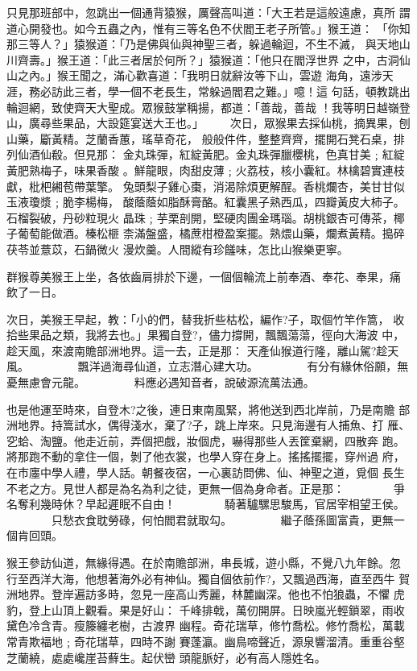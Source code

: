 \begin{pinyinscope}
{只見那班部中，忽跳出一個通背猿猴，厲聲高叫道：「大王若是這般遠慮，真所
謂道心開發也。如今五蟲之內，惟有三等名色不伏閻王老子所管。」猴王道：
「你知那三等人？」猿猴道：「乃是佛與仙與神聖三者，躲過輪迴，不生不滅，
與天地山川齊壽。」猴王道：「此三者居於何所？」猿猴道：「他只在閻浮世界
之中，古洞仙山之內。」猴王聞之，滿心歡喜道：「我明日就辭汝等下山，雲遊
海角，遠涉天涯，務必訪此三者，學一個不老長生，常躲過閻君之難。」噫！這
句話，頓教跳出輪迴網，致使齊天大聖成。眾猴鼓掌稱揚，都道：「善哉，善哉
！我等明日越嶺登山，廣尋些果品，大設筵宴送大王也。」
　　次日，眾猴果去採仙桃，摘異果，刨山藥，斸黃精。芝蘭香蕙，瑤草奇花，
般般件件，整整齊齊，擺開石凳石桌，排列仙酒仙殽。但見那：
金丸珠彈，紅綻黃肥。金丸珠彈臘櫻桃，色真甘美﹔紅綻黃肥熟梅子，味果香酸
。鮮龍眼，肉甜皮薄﹔火荔枝，核小囊紅。林檎碧實連枝獻，枇杷緗苞帶葉擎。
兔頭梨子雞心棗，消渴除煩更解酲。香桃爛杏，美甘甘似玉液瓊漿﹔脆李楊梅，
酸蔭蔭如脂酥膏酪。紅囊黑子熟西瓜，四瓣黃皮大柿子。石榴裂破，丹砂粒現火
晶珠﹔芋栗剖開，堅硬肉團金瑪瑙。胡桃銀杏可傳茶，椰子葡萄能做酒。榛松榧
柰滿盤盛，橘蔗柑橙盈案擺。熟煨山藥，爛煮黃精。搗碎茯苓並薏苡，石鍋微火
漫炊羹。人間縱有珍饈味，怎比山猴樂更寧。

群猴尊美猴王上坐，各依齒肩排於下邊，一個個輪流上前奉酒、奉花、奉果，痛
飲了一日。

次日，美猴王早起，教：「小的們，替我折些枯松，編作?子，取個竹竿作篙，
收拾些果品之類，我將去也。」果獨自登?，儘力撐開，飄飄蕩蕩，徑向大海波
中，趁天風，來渡南贍部洲地界。這一去，正是那：
        天產仙猴道行隆，離山駕?趁天風。
　　　　飄洋過海尋仙道，立志潛心建大功。
　　　　有分有緣休俗願，無憂無慮會元龍。
　　　　料應必遇知音者，說破源流萬法通。

也是他運至時來，自登木?之後，連日東南風緊，將他送到西北岸前，乃是南贍
部洲地界。持篙試水，偶得淺水，棄了?子，跳上岸來。只見海邊有人捕魚、打
雁、穵蛤、淘鹽。他走近前，弄個把戲，妝個虎，嚇得那些人丟筐棄網，四散奔
跑。將那跑不動的拿住一個，剝了他衣裳，也學人穿在身上。搖搖擺擺，穿州過
府，在市廛中學人禮，學人話。朝餐夜宿，一心裏訪問佛、仙、神聖之道，覓個
長生不老之方。見世人都是為名為利之徒，更無一個為身命者。正是那：
　　　　爭名奪利幾時休？早起遲眠不自由！
　　　　騎著驢騾思駿馬，官居宰相望王侯。
　　　　只愁衣食耽勞碌，何怕閻君就取勾。
　　　　繼子蔭孫圖富貴，更無一個肯回頭。

猴王參訪仙道，無緣得遇。在於南贍部洲，串長城，遊小縣，不覺八九年餘。忽
行至西洋大海，他想著海外必有神仙。獨自個依前作?，又飄過西海，直至西牛
賀洲地界。登岸遍訪多時，忽見一座高山秀麗，林麓幽深。他也不怕狼蟲，不懼
虎豹，登上山頂上觀看。果是好山：
千峰排戟，萬仞開屏。日映嵐光輕鎖翠，雨收黛色冷含青。瘦籐纏老樹，古渡界
幽程。奇花瑞草，修竹喬松。修竹喬松，萬載常青欺福地﹔奇花瑞草，四時不謝
賽蓬瀛。幽鳥啼聲近，源泉響溜清。重重谷壑芝蘭繞，處處巉崖苔蘚生。起伏巒
頭龍脈好，必有高人隱姓名。

}
\end{pinyinscope}
